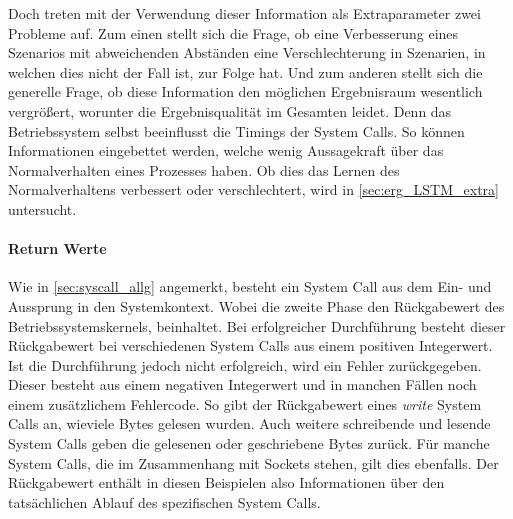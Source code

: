                     Doch treten mit der Verwendung dieser Information als Extraparameter zwei Probleme auf.
                    Zum einen stellt sich die Frage, ob eine Verbesserung eines Szenarios mit abweichenden Abständen eine Verschlechterung in Szenarien, in welchen dies nicht der Fall ist, zur Folge hat.
                    Und zum anderen stellt sich die generelle Frage, ob diese Information den möglichen Ergebnisraum wesentlich vergrößert, worunter die Ergebnisqualität im Gesamten leidet.
                    Denn das Betriebssystem selbst beeinflusst die Timings der System Calls.
                    So können Informationen eingebettet werden, welche wenig Aussagekraft über das Normalverhalten eines Prozesses haben.
                    Ob dies das Lernen des Normalverhaltens verbessert oder verschlechtert, wird in \autoref{sec:erg_LSTM_extra} untersucht.

                \paragraph{Return Werte}

                    Wie in \autoref{sec:syscall_allg} angemerkt, besteht ein System Call aus dem Ein- und Aussprung in den Systemkontext.
                    Wobei die zweite Phase den Rückgabewert des Betriebssystemskernels, beinhaltet.
                    Bei erfolgreicher Durchführung besteht dieser Rückgabewert bei verschiedenen System Calls aus einem positiven Integerwert.
                    Ist die Durchführung jedoch nicht erfolgreich, wird ein Fehler zurückgegeben.
                    Dieser besteht aus einem negativen Integerwert und in manchen Fällen noch einem zusätzlichem Fehlercode.
                    So gibt der Rückgabewert eines \textit{write} System Calls an, wieviele Bytes gelesen wurden.
                    Auch weitere schreibende und lesende System Calls geben die gelesenen oder geschriebene Bytes zurück.
                    Für manche System Calls, die im Zusammenhang mit Sockets stehen, gilt dies ebenfalls.
                    Der Rückgabewert enthält in diesen Beispielen also Informationen über den tatsächlichen Ablauf des spezifischen System Calls.\par\medskip

